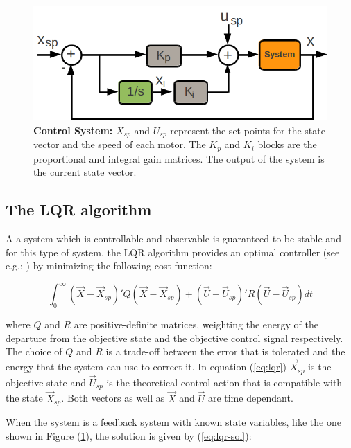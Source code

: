 \documentclass[conference]{IEEEtran}
\newcommand{\refp}[1]{(\ref{#1})}
\begin{document}
\begin{figure}
	\centering
	\includegraphics[width=1\columnwidth]{./pics_paper/diagrama_bloques_eng.png}
	\caption{\textbf{Control System:} $X_{sp}$ and $U_{sp}$ represent the set-points for the state vector and the speed of each motor. The $K_p$ and $K_i$ blocks are the proportional and integral gain matrices. The output of the system is the current state vector.}
	\label{fig:diagrama_bloques_eng.pdf}
\end{figure}

\subsection{The LQR algorithm}
\label{sec:lqr}

A a system which is controllable and observable is guaranteed to be stable and for this type of system, the LQR algorithm provides an optimal controller (see e.g.: \cite{bib:lqrnotes}) by minimizing the following cost function:

\begin{equation}
\label{eq:lqr}
\int_{0}^{\infty}  (\vec{X}-\vec{X}_{sp})'Q (\vec{X}-\vec{X}_{sp})+(\vec{U}-\vec{U}_{sp})'R(\vec{U}-\vec{U}_{sp})dt
\end{equation}

where $Q$ and $R$ are positive-definite matrices, weighting the energy of the departure from the objective state and the objective control signal respectively. The choice of $Q$ and $R$ is a trade-off between the error that is tolerated and the energy that the system can use to correct it. In equation \refp{eq:lqr} $\vec{X}_{sp}$ is the objective state and $\vec{U}_{sp}$ is the theoretical control action that is compatible with the state $\vec{X}_{sp}$. Both vectors as well as $\vec{X}$ and $\vec{U}$ are time dependant. 

 When the system is a feedback system with known state variables, like the one shown in Figure \refp{fig:diagrama_bloques_eng.pdf}, the solution is given by \refp{eq:lqr-sol}:
\end{document}
